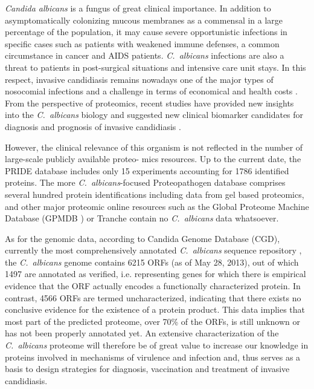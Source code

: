 \textit{Candida albicans} is a fungus of great clinical importance. In
addition to asymptomatically colonizing mucous membranes
as a commensal in a large percentage of the population, it
may cause severe opportunistic infections in specific cases
such as patients with weakened immune defenses, a common
circumstance in cancer and AIDS patients. \textit{\mbox{C. albicans}} infections
are also a threat to patients in post-surgical situations and
intensive care unit stays. In this respect, invasive candidiasis
remains nowadays one of the major types of nosocomial
infections and a challenge in terms of economical and health
costs \citep{Wisplinghoff2004, Moran2010, Tong2008}.
From the perspective of proteomics, recent studies
have provided new insights into the \textit{\mbox{C. albicans}} biology and
suggested new clinical biomarker candidates for diagnosis and
prognosis of invasive candidiasis \citep{Pitarch2006, Pitarch2006a,
Fernandez-Arenas2007, Pitarch2011}.

However, the clinical relevance of this organism is not
reflected in the number of large-scale publicly available proteo-
mics resources. Up to the current date, the PRIDE \citep{Vizcaino2013} database
includes only 15 experiments accounting for 1786 identified
proteins. The more \textit{\mbox{C. albicans}}-focused Proteopathogen database
\citep{Vialas2009b} comprises several hundred protein identifications including
data from gel based proteomics, and other major proteomic
online resources such as the Global Proteome Machine Database 
(GPMDB \citep{Craig2004}) or Tranche \citep{Smith2011} contain no \textit{\mbox{C. albicans}} data
whatsoever.

As for the genomic data, according to Candida Genome
Database (CGD), currently the most comprehensively annotated
\textit{\mbox{C. albicans}} sequence repository \citep{Costanzo2006a}, the \textit{\mbox{C. albicans}} genome
contains 6215 ORFs (as of May 28, 2013), out of which 1497 are
annotated as verified, i.e. representing genes for which there is
empirical evidence that the ORF actually encodes a functionally
characterized protein. In contrast, 4566 ORFs are termed
uncharacterized, indicating that there exists no conclusive evidence 
for the existence of a protein product. This data implies
that most part of the predicted proteome, over 70\% of the ORFs, is
still unknown or has not been properly annotated yet. An
extensive characterization of the \textit{\mbox{C. albicans}} proteome will
therefore be of great value to increase our knowledge in proteins
involved in mechanisms of virulence and infection and, thus
serves as a basis to design strategies for diagnosis, vaccination
and treatment of invasive candidiasis.

